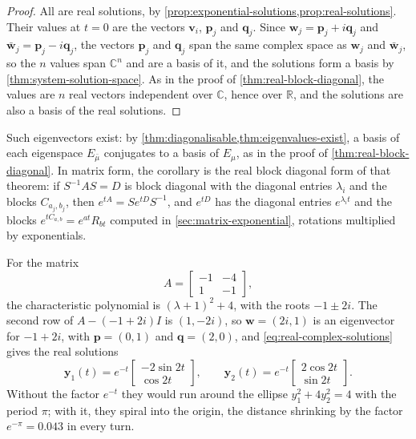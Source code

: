 \begin{proof}
All are real solutions, by \cref{prop:exponential-solutions,prop:real-solutions}. Their values at $t=0$ are the vectors $\mathbf v_i$, $\mathbf p_j$ and $\mathbf q_j$. Since $\mathbf w_j=\mathbf p_j+i\mathbf q_j$ and $\bar{\mathbf w}_j=\mathbf p_j-i\mathbf q_j$, the vectors $\mathbf p_j$ and $\mathbf q_j$ span the same complex space as $\mathbf w_j$ and $\bar{\mathbf w}_j$, so the $n$ values span $\mathbb C^n$ and are a basis of it, and the solutions form a basis by \cref{thm:system-solution-space}. As in the proof of \cref{thm:real-block-diagonal}, the values are $n$ real vectors independent over $\mathbb C$, hence over $\mathbb R$, and the solutions are also a basis of the real solutions.
\end{proof}

Such eigenvectors exist: by \cref{thm:diagonalisable,thm:eigenvalues-exist}, a basis of each eigenspace $E_{\bar\mu}$ conjugates to a basis of $E_\mu$, as in the proof of \cref{thm:real-block-diagonal}. In matrix form, the corollary is the real block diagonal form of that theorem: if $S^{-1}AS=D$ is block diagonal with the diagonal entries $\lambda_i$ and the blocks $C_{a_j,b_j}$, then $e^{tA}=Se^{tD}S^{-1}$, and $e^{tD}$ has the diagonal entries $e^{\lambda_it}$ and the blocks $e^{tC_{a,b}}=e^{at}R_{bt}$ computed in \cref{sec:matrix-exponential}, rotations multiplied by exponentials.

For the matrix
\begin{equation}
A=\begin{bmatrix}-1&-4\\1&-1\end{bmatrix},
\label{eq:spiral-example}
\end{equation}
the characteristic polynomial is $(\lambda+1)^2+4$, with the roots $-1\pm2i$. The second row of $A-(-1+2i)I$ is $(1,-2i)$, so $\mathbf w=(2i,1)$ is an eigenvector for $-1+2i$, with $\mathbf p=(0,1)$ and $\mathbf q=(2,0)$, and \eqref{eq:real-complex-solutions} gives the real solutions
\[
\mathbf y_1(t)=e^{-t}\begin{bmatrix}-2\sin2t\\\cos2t\end{bmatrix},\qquad\mathbf y_2(t)=e^{-t}\begin{bmatrix}2\cos2t\\\sin2t\end{bmatrix}.
\]
Without the factor $e^{-t}$ they would run around the ellipse $y_1^2+4y_2^2=4$ with the period $\pi$; with it, they spiral into the origin, the distance shrinking by the factor $e^{-\pi}=0.043$ in every turn.

